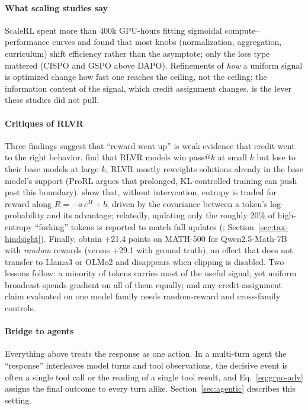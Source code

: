 \paragraph{What scaling studies say}
ScaleRL \citep{khatri2025art} spent more than 400k GPU-hours fitting sigmoidal compute--performance curves and found that most knobs (normalization, aggregation, curriculum) shift efficiency rather than the asymptote; only the loss type mattered (CISPO and GSPO above DAPO). Refinements of \emph{how} a uniform signal is optimized change how fast one reaches the ceiling, not the ceiling; the information content of the signal, which credit assignment changes, is the lever these studies did not pull.

\paragraph{Critiques of RLVR}
Three findings suggest that ``reward went up'' is weak evidence that credit went to the right behavior. \citet{yue2025does} find that RLVR models win pass@$k$ at small $k$ but lose to their base models at large $k$, \ie RLVR mostly reweights solutions already in the base model's support (ProRL \citep{liu2025prorl}\unverified{} argues that prolonged, KL-controlled training can push past this boundary). \citet{cui2025entropy} show that, without intervention, entropy is traded for reward along $R=-a\,e^{H}+b$, driven by the covariance between a token's log-probability and its advantage; relatedly, updating only the roughly 20\% of high-entropy ``forking'' tokens is reported to match full updates (\citealp{wang2025beyond}\unverified; Section~\ref{sec:tax-hindsight}). Finally, \citet{shao2025spurious} obtain +21.4 points on MATH-500 for Qwen2.5-Math-7B with \emph{random} rewards (versus +29.1 with ground truth), an effect that does not transfer to Llama3 or OLMo2 and disappears when clipping is disabled. Two lessons follow: a minority of tokens carries most of the useful signal, yet uniform broadcast spends gradient on all of them equally; and any credit-assignment claim evaluated on one model family needs random-reward and cross-family controls.

\paragraph{Bridge to agents}
Everything above treats the response as one action. In a multi-turn agent the ``response'' interleaves model turns and tool observations, the decisive event is often a single tool call or the reading of a single tool result, and Eq.~\ref{eq:grpo-adv} assigns the final outcome to every turn alike. Section~\ref{sec:agentic} describes this setting.
